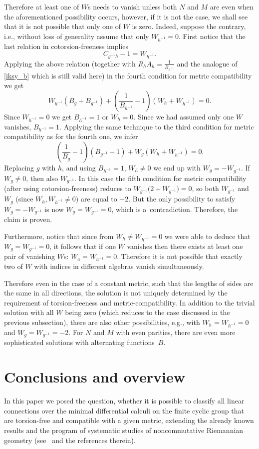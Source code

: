 \documentclass[10pt,a4paper]{amsart}
\numberwithin{equation}{section}
\begin{document}
Therefore at least one of $W$s needs to vanish unless both $N$ and $M$ are even when the aforementioned possibility occurs, however, if it is not the case, we shall see that it is not possible that only one of $W$ is zero.
Indeed, suppose the contrary, i.e., without loss of generality assume that only $W_{h^{-1}}=0$. First notice that the last
relation in cotorsion-freeness implies
\[ C_{g^{-1}h}-1=W_{h^{-1}}.\]
Applying the above relation (together with $R_hA_h=\frac{1}{B_{h^{-1}}}$ and the analogue of \eqref{iksy_b} which is still valid here) in the fourth condition for metric compatibility we get
\[ W_{h^{-1}}(B_{g}+B_{g^{-1}})+\left(\frac{1}{B_{h^{-1}}}-1\right)(W_h+W_{h^{-1}})=0.\]
Since $W_{h^{-1}}=0$ we get $B_{h^{-1}}=1$ or $W_h=0$. Since we had assumed only one $W$ vanishes, $B_{h^{-1}}=1$. Applying the same technique to the third condition for metric compatibility as for the fourth one, we infer
\[ \left(\frac{1}{B_g}-1\right)(B_{g^{-1}}-1)+W_g(W_h+W_{h^{-1}})=0.\]
Replacing $g$ with $h$, and using $B_{h^{-1}}=1$, $W_h\neq 0$ we end up with $W_g=-W_{g^{-1}}$. If $W_{g}\neq 0$, then also $W_{g^{-1}}$. In this case the fifth condition for metric compatibility (after using cotorsion-freeness) reduces to $W_{g^{-1}}\big(2+W_{g^{-1}}\big)=0$, so both $W_{g^{-1}}$ and $W_{g}$ (since $W_h,W_{h^{-1}}\neq 0$) are equal to $-2$. But the only possibility to satisfy $W_g=-W_{g^{-1}}$ is now $W_g=W_{g^{-1}}=0$, which is a~contradiction. Therefore, the claim is proven.

Furthermore, notice that since from $W_{h}\neq W_{h^{-1}}=0$ we were able to deduce that $W_g=W_{g^{-1}}=0$, it follows that if one $W$ vanishes then there exists at least one pair of vanishing $W$s: $W_a=W_{a^{-1}}=0$. Therefore it is not possible that exactly two of $W$ with indices in different algebras
vanish simultaneously.

Therefore even in the case of a constant metric, such that the lengths of sides are
the same in all directions, the solution is not uniquely determined by the requirement of torsion-freeness and metric-compatibility. In addition to the trivial solution with all $W$ being zero (which reduces to the case discussed in the previous subsection), there are also other possibilities, e.g., with $W_h=W_{h^{-1}}=0$ and $W_{g}=W_{g^{-1}}=-2$. For $N$ and $M$ with even parities, there are even more sophisticated solutions with alternating functions~$B$.

\section{Conclusions and overview}
In this paper we posed the question, whether it is possible to classify all linear connections over the minimal differential calculi on
the finite cyclic group that are torsion-free and compatible with a given metric,
extending the already known results and the program of systematic studies of
noncommutative Riemannian geometry (see~\cite{BM_book} and the references therein).
\end{document}
